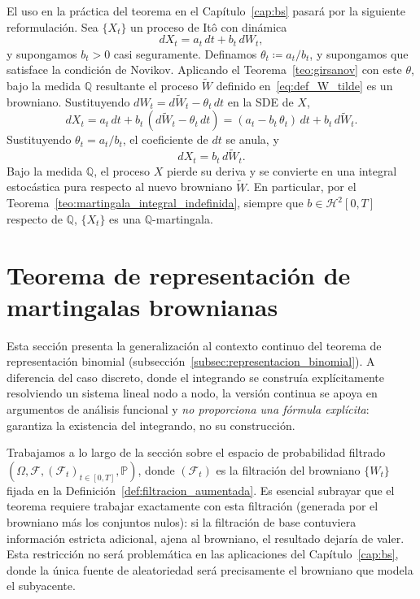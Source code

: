 \documentclass[11pt,a4paper,oneside]{report}
\theoremstyle{plain}
\theoremstyle{definition}
\theoremstyle{remark}
\newcommand{\PP}{\mathbb{P}}
\newcommand{\Q}{\mathbb{Q}}
\newcommand{\F}{\mathcal{F}}
\newcommand{\1}{\mathbf{1}}
\newcommand{\eqdef}{\coloneqq}
\begin{document}
El uso
en la práctica del teorema en el Capítulo~\ref{cap:bs} pasará por la
siguiente reformulación. Sea $\{X_t\}$ un proceso de Itô con dinámica
\begin{equation*}
  dX_t = a_t\, dt + b_t\, dW_t,
\end{equation*}
y supongamos $b_t > 0$ casi seguramente. Definamos $\theta_t \eqdef
a_t / b_t$, y supongamos que satisface la condición de Novikov.
Aplicando el Teorema~\ref{teo:girsanov} con este $\theta$, bajo la
medida $\Q$ resultante el proceso $\widetilde{W}$ definido
en~\eqref{eq:def_W_tilde} es un browniano. Sustituyendo $dW_t =
d\widetilde{W}_t - \theta_t\, dt$ en la SDE de $X$,
\begin{equation*}
  dX_t = a_t\, dt + b_t\, (d\widetilde{W}_t - \theta_t\, dt)
       = (a_t - b_t\, \theta_t)\, dt + b_t\, d\widetilde{W}_t.
\end{equation*}
Sustituyendo $\theta_t = a_t/b_t$, el coeficiente de $dt$ se anula, y
\begin{equation}\label{eq:girsanov_operativo}
  \boxed{\; dX_t = b_t\, d\widetilde{W}_t. \;}
\end{equation}
Bajo la medida $\Q$, el proceso $X$ pierde su deriva y se convierte
en una integral estocástica pura respecto al nuevo browniano
$\widetilde{W}$. En particular, por el
Teorema~\ref{teo:martingala_integral_indefinida}, siempre que $b \in \mathcal{H}^2[0, T]$ respecto de $\Q$, $\{X_t\}$ es una
$\Q$-martingala.

\section{Teorema de representación de martingalas brownianas}
\label{sec:representacion_martingalas}

Esta sección presenta la generalización al contexto continuo del
teorema de representación binomial
(subsección~\ref{subsec:representacion_binomial}). A diferencia del
caso discreto, donde el integrando se construía explícitamente
resolviendo un sistema lineal nodo a nodo, la versión continua se
apoya en argumentos de análisis funcional y \emph{no proporciona
una fórmula explícita}: garantiza la existencia del integrando, no
su construcción.

\medskip

Trabajamos a lo largo de la
sección sobre el espacio de probabilidad filtrado $(\Omega, \F,
(\F_t)_{t \in [0, T]}, \PP)$, donde $(\F_t)$ es la filtración del
browniano $\{W_t\}$ fijada en la Definición~\ref{def:filtracion_aumentada}. Es esencial subrayar que el teorema requiere trabajar exactamente
con esta filtración (generada por el browniano más los conjuntos
nulos): si la filtración de base contuviera información estricta
adicional, ajena al browniano, el resultado dejaría de valer. Esta restricción no será problemática en las aplicaciones del
Capítulo~\ref{cap:bs}, donde la única fuente de aleatoriedad será
precisamente el browniano que modela el subyacente.
\end{document}
